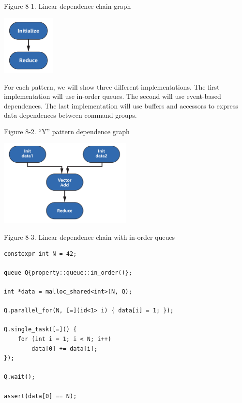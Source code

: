 \hspace*{\fill} \par %
Figure 8-1. Linear dependence chain graph
\begin{center}
	\includegraphics[width=0.2\textwidth]{content/chapter-8/images/2}
\end{center}

For each pattern, we will show three different implementations. The first implementation will use in-order queues. The second will use event-based dependences. The last implementation will use buffers and accessors to express data dependences between command groups.\par

\hspace*{\fill} \par %
Figure 8-2. “Y” pattern dependence graph
\begin{center}
	\includegraphics[width=0.5\textwidth]{content/chapter-8/images/3}
\end{center}

\hspace*{\fill} \par %
Figure 8-3. Linear dependence chain with in-order queues
\begin{lstlisting}[caption={}]
constexpr int N = 42;

queue Q{property::queue::in_order()};

int *data = malloc_shared<int>(N, Q);

Q.parallel_for(N, [=](id<1> i) { data[i] = 1; });

Q.single_task([=]() {
	for (int i = 1; i < N; i++)
		data[0] += data[i];
});

Q.wait();

assert(data[0] == N);
\end{lstlisting}

